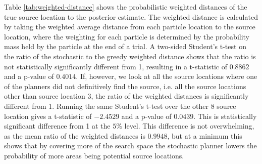 \documentclass[submit, 12pt]{aiaa-pretty-modified}
\begin{document}
Table \ref{tab:weighted-distance} shows the probabilistic weighted distances
of the true source location to the posterior estimate.  The weighted distance is
calculated by taking the weighted average distance from each particle location
to the source location, where the weighting for each particle is determined by the
probability mass held by the particle at the end of a trial.  A two-sided
Student's t-test on the ratio of the stochastic to the greedy weighted distance
shows that the ratio is not statistically significantly different from 1,
resulting in a t-statistic of $0.8862$ and a p-value of $0.4014$. If, however,
we look at all the source locations where one of the planners did not
definitively find the source, i.e. all the source locations other than source
location 3, the ratio of the weighted distances is significantly different from
1. Running the same Student's t-test over the other 8 source location gives a
t-statistic of $-2.4529$ and a p-value of $0.0439$. This is statistically
significant difference from 1 at the $5\%$ level. This difference is not
overwhelming, as the mean ratio of the weighted distances is $0.9948$, but at a
minimum this shows that by covering more of the search space the stochastic planner
lowers the probability of more areas being potential source locations.

\end{document}
